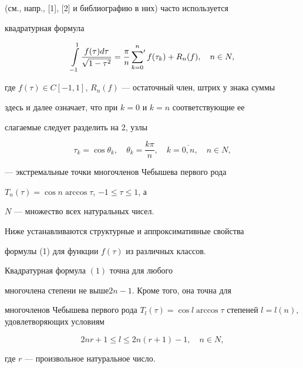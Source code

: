 (см., напр., [1], [2] и библиографию в них) часто используется


квадратурная формула


\begin{equation}


\int \limits_{-1}^1 \frac{f( \tau) d \tau}{\sqrt{1- \tau^2}}= \frac{\pi}{n}


\sideset{}{'}\sum_{k=0}^n f(\tau_k)+R_n(f), \quad n \in N,


\end{equation}


где $f(\tau) \in C[-1,1]$, $R_n(f) $ --- остаточный член, штрих у знака суммы


здесь и далее означает, что при $k=0$ и $k=n$  соответствующие ее


слагаемые следует разделить на 2, узлы


\begin{equation}


\tau_k= \cos \theta_k, \quad \theta_k= \frac{k \pi}{n}, \quad k=


\overline{0,n}, \quad n \in N,


\end{equation}


--- экстремальные точки многочленов Чебышева первого рода


$T_n(\tau) = \cos n \arccos \tau$, $-1 \leq \tau \leq 1$, а


$N$ --- множество всех натуральных чисел.





Ниже устанавливаются структурные и аппроксимативные свойства


формулы (1) для функции $f(\tau)$ из различных классов.





\begin{thm}


Квадратурная формула $(1)$ точна для любого


многочлена степени не выше\linebreak $2n-1$. Кроме того, она точна для


многочленов Чебышева первого рода $T_l( \tau) = \cos l \arccos 


\tau$ степеней $l=l(n)$, удовлетворяющих условиям


\begin{equation}


2nr+1 \leq l \leq 2n(r+1)-1, \quad n \in N,


\end{equation}


где $r$ --- произвольное натуральное число.


\end{thm}





